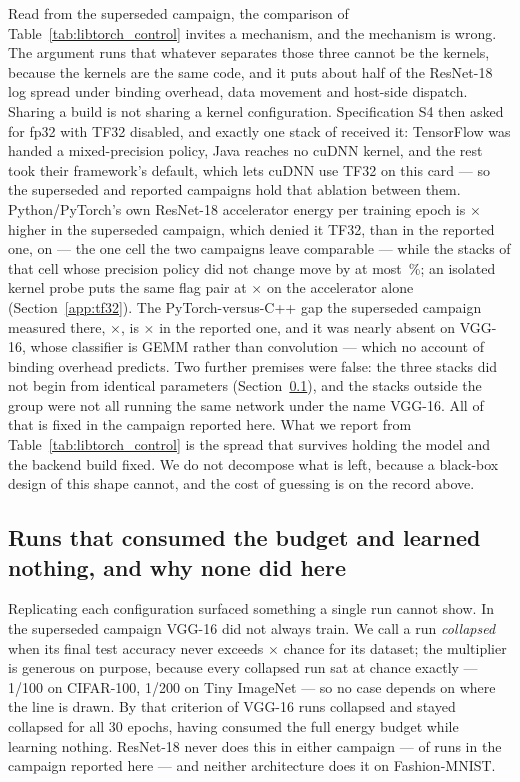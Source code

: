 Read from the superseded campaign, the comparison of
Table~\ref{tab:libtorch_control} invites a mechanism, and the mechanism is
wrong. The argument runs that whatever separates those three cannot be the
kernels, because the kernels are the same code, and it puts about half of the
ResNet-18 log spread under binding overhead, data movement and host-side
dispatch. Sharing a build is not sharing a kernel configuration. Specification
S4 then asked for fp32 with TF32 disabled, and exactly one stack of
\vEcosystems{} received it: TensorFlow was handed a mixed-precision policy,
Java reaches no cuDNN kernel, and the rest took their framework's default, which
lets cuDNN use TF32 on this card --- so the superseded and reported campaigns
hold that ablation between them. Python/PyTorch's own ResNet-18 accelerator
energy per training epoch is \vPrecisionPytorchRatioMin$\times$ higher in the
superseded campaign, which denied it TF32, than in the reported one, on
\vPrecisionGapDataset{} --- the one cell the two campaigns leave comparable --- while the \vPrecisionControlStacks{} stacks of that cell
whose precision policy did not change move by at most
\vPrecisionOthersMaxChangePct\,\%; an isolated kernel probe puts the same flag
pair at \vPrecisionKernelDetEnergyRatio$\times$ on the accelerator alone
(Section~\ref{app:tf32}). The
PyTorch-versus-C++ gap the superseded campaign measured there,
\vPrecisionGapBefore$\times$, is \vPrecisionGapAfter$\times$ in the reported one, and
it was nearly absent on VGG-16, whose classifier is GEMM rather than convolution
--- which no account of binding overhead predicts. Two further premises were
false: the three stacks did not begin from identical parameters
(Section~\ref{app:collapse}), and the stacks outside the group were not
all running the same network under the name VGG-16. All of that is fixed in the
campaign reported here. What we report from Table~\ref{tab:libtorch_control} is
the spread that survives holding the model and the backend build fixed. We do
not decompose what is left, because a black-box design of this shape cannot, and
the cost of guessing is on the record above.

\subsection{Runs that consumed the budget and learned nothing, and why none did here}
\label{app:collapse}

Replicating each configuration surfaced something a single run cannot show. In
the superseded campaign VGG-16 did not always train. We call a run
\emph{collapsed} when its final test accuracy never exceeds
\vCollapseFactor$\times$ chance for its dataset; the multiplier is generous on
purpose, because every collapsed run sat at chance exactly --- 1/100 on
CIFAR-100, 1/200 on Tiny ImageNet --- so no case depends on where the line is
drawn. By that criterion \vCollapseFirstVgg{} of \vCollapseFirstVggRuns{} VGG-16
runs collapsed and stayed collapsed for all 30 epochs, having consumed the full
energy budget while learning nothing. ResNet-18 never does this in either
campaign --- \vCollapsedResnet{} of \vCollapsedResnetRuns{} runs in the campaign
reported here --- and neither architecture does it on Fashion-MNIST.


